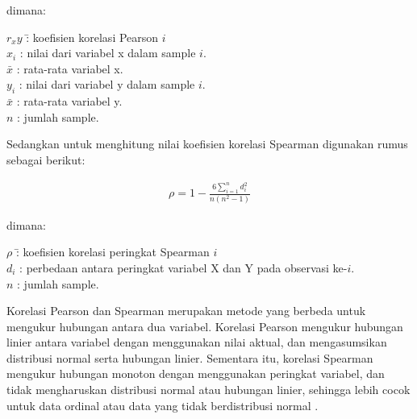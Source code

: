 \hspace{-1,2cm}dimana:
\vspace{-0.5cm}
\begin{tabbing}
	$r_xy$ \hspace{2em} \= : koefisien korelasi Pearson $i$\\
	$x_{i}$ \> : nilai dari variabel x dalam sample $i$. \\
	$\bar{x}$ \> : rata-rata variabel x. \\
	$y_{i}$ \> : nilai dari variabel y dalam sample $i$. \\
	$\bar{x}$ \> : rata-rata variabel y. \\
	$n$ \> : jumlah sample. \\
\end{tabbing}
\vspace{-0.5cm}

Sedangkan untuk menghitung nilai koefisien korelasi Spearman digunakan rumus sebagai berikut:

\begin{equation}
	\begin{aligned}
		\rho = 1 - \frac{6 \sum_{i=1}^n d_i^2}{n(n^2 - 1)}
	\end{aligned}
\end{equation}

\hspace{-1,2cm}dimana:
\vspace{-0.5cm}
\begin{tabbing}
	$\rho$ \hspace{2em} \= : koefisien korelasi peringkat Spearman $i$\\
	$d_{i}$ \> : perbedaan antara peringkat variabel X dan Y pada observasi ke-$i$. \\
	$n$ \> : jumlah sample. \\
\end{tabbing}
\vspace{-0.5cm}

Korelasi Pearson dan Spearman merupakan metode yang berbeda untuk mengukur hubungan antara dua variabel. Korelasi Pearson mengukur hubungan linier antara variabel dengan menggunakan nilai aktual, dan mengasumsikan distribusi normal serta hubungan linier. Sementara itu, korelasi Spearman mengukur hubungan monoton dengan menggunakan peringkat variabel, dan tidak mengharuskan distribusi normal atau hubungan linier, sehingga lebih cocok untuk data ordinal atau data yang tidak berdistribusi normal \citep{Akoglu2018}.


